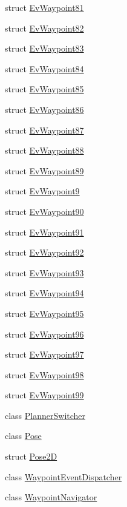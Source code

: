 \begin{DoxyCompactItemize}
\item 
struct \hyperlink{structmove__base__z__client_1_1EvWaypoint81}{Ev\+Waypoint81}
\item 
struct \hyperlink{structmove__base__z__client_1_1EvWaypoint82}{Ev\+Waypoint82}
\item 
struct \hyperlink{structmove__base__z__client_1_1EvWaypoint83}{Ev\+Waypoint83}
\item 
struct \hyperlink{structmove__base__z__client_1_1EvWaypoint84}{Ev\+Waypoint84}
\item 
struct \hyperlink{structmove__base__z__client_1_1EvWaypoint85}{Ev\+Waypoint85}
\item 
struct \hyperlink{structmove__base__z__client_1_1EvWaypoint86}{Ev\+Waypoint86}
\item 
struct \hyperlink{structmove__base__z__client_1_1EvWaypoint87}{Ev\+Waypoint87}
\item 
struct \hyperlink{structmove__base__z__client_1_1EvWaypoint88}{Ev\+Waypoint88}
\item 
struct \hyperlink{structmove__base__z__client_1_1EvWaypoint89}{Ev\+Waypoint89}
\item 
struct \hyperlink{structmove__base__z__client_1_1EvWaypoint9}{Ev\+Waypoint9}
\item 
struct \hyperlink{structmove__base__z__client_1_1EvWaypoint90}{Ev\+Waypoint90}
\item 
struct \hyperlink{structmove__base__z__client_1_1EvWaypoint91}{Ev\+Waypoint91}
\item 
struct \hyperlink{structmove__base__z__client_1_1EvWaypoint92}{Ev\+Waypoint92}
\item 
struct \hyperlink{structmove__base__z__client_1_1EvWaypoint93}{Ev\+Waypoint93}
\item 
struct \hyperlink{structmove__base__z__client_1_1EvWaypoint94}{Ev\+Waypoint94}
\item 
struct \hyperlink{structmove__base__z__client_1_1EvWaypoint95}{Ev\+Waypoint95}
\item 
struct \hyperlink{structmove__base__z__client_1_1EvWaypoint96}{Ev\+Waypoint96}
\item 
struct \hyperlink{structmove__base__z__client_1_1EvWaypoint97}{Ev\+Waypoint97}
\item 
struct \hyperlink{structmove__base__z__client_1_1EvWaypoint98}{Ev\+Waypoint98}
\item 
struct \hyperlink{structmove__base__z__client_1_1EvWaypoint99}{Ev\+Waypoint99}
\item 
class \hyperlink{classmove__base__z__client_1_1PlannerSwitcher}{Planner\+Switcher}
\item 
class \hyperlink{classmove__base__z__client_1_1Pose}{Pose}
\item 
struct \hyperlink{structmove__base__z__client_1_1Pose2D}{Pose2D}
\item 
class \hyperlink{classmove__base__z__client_1_1WaypointEventDispatcher}{Waypoint\+Event\+Dispatcher}
\item 
class \hyperlink{classmove__base__z__client_1_1WaypointNavigator}{Waypoint\+Navigator}
\end{DoxyCompactItemize}
